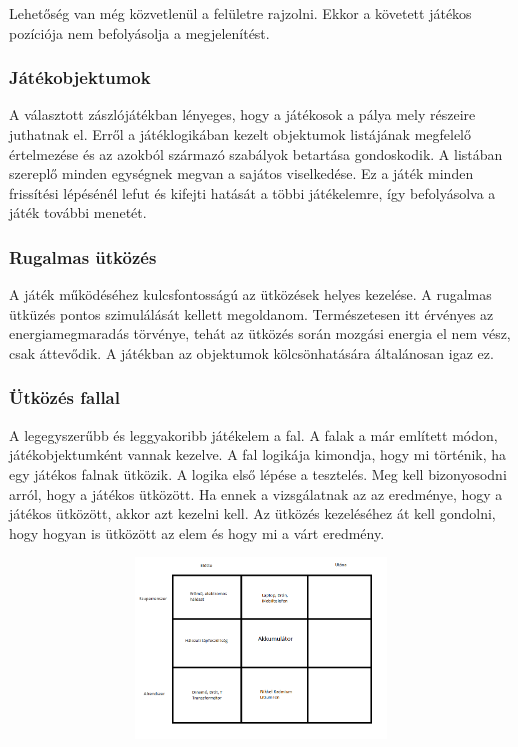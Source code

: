 \documentclass[]{article}
\begin{document}
Lehetőség van még közvetlenül a felületre rajzolni. Ekkor a követett
játékos pozíciója nem befolyásolja a megjelenítést.


\subsubsection{Játékobjektumok}

A választott zászlójátékban lényeges, hogy a játékosok a pálya mely
részeire juthatnak el. Erről a játéklogikában kezelt objektumok
listájának megfelelő értelmezése és az azokból származó szabályok
betartása gondoskodik. A listában szereplő minden egységnek megvan a
sajátos viselkedése. Ez a játék minden frissítési lépésénél lefut és
kifejti hatását a többi játékelemre, így befolyásolva a játék további
menetét.


\subsubsection{Rugalmas ütközés}

A játék működéséhez kulcsfontosságú az ütközések helyes kezelése. A
rugalmas ütküzés pontos szimulálását kellett megoldanom. Természetesen
itt érvényes az energiamegmaradás törvénye, tehát az ütközés során
mozgási energia el nem vész, csak áttevődik. A játékban az objektumok
kölcsönhatására általánosan igaz ez.


\subsubsection{Ütközés fallal}

A legegyszerűbb és leggyakoribb játékelem a fal. A falak a már említett
módon, játékobjektumként vannak kezelve. A fal logikája kimondja, hogy
mi történik, ha egy játékos falnak ütközik. A logika első lépése a
tesztelés. Meg kell bizonyosodni arról, hogy a játékos ütközött. Ha
ennek a vizsgálatnak az az eredménye, hogy a játékos ütközött, akkor azt
kezelni kell. Az ütközés kezeléséhez át kell gondolni, hogy hogyan is
ütközött az elem és hogy mi a várt eredmény.

\includegraphics[width=5.51181in,height=1.89375in]{media/image3.png}
\end{document}

